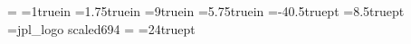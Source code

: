 \magnification=
\hoffset=1truein
\voffset=1.75truein
\hsize=9truein
\vsize=5.75truein
\def\plainoutput{\shipout\vbox{\makelogo\nointerlineskip\makeheadline
  \vskip-5pt\pagebody
  \makefootline
  \makebottom}
 \advancepageno
 \ifnum\outputpenalty>-20000 \else\dosupereject\fi}
 \newskip\headlineskip
 \headlineskip=-40.5truept
 \newskip\headlineheight
 \headlineheight=8.5truept
\font\jplfont=jpl_logo scaled694
\def\makelogo{\vbox to0pt{\vskip-.65truein
 \hbox{\jplfont JPL\hss}\vss}}
\def\makeheadline{\vbox to0pt{\vskip\headlineskip
  \line{\vbox to\headlineheight{}\the\headline}\vss}
 \nointerlineskip}
\footline={\hfil}
\newskip\footlineskip
\footlineskip=24truept
\def\makefootline{\baselineskip=\footlineskip\line{\the\footline}}
\def\outputformatnumber#1{\ifx\pagenumformat\arabic \count255=#1%
\else\count255=-#1\fi{\ifnum\count255<0%
\ifx\pagenumformat\ROMAN\uppercase\expandafter{\romannumeral-\count255}%
\else\romannumeral-\count255\fi\else\number\count255\fi%
}}
\def\makebottom{\bottomsize\bottomstyle\baselineskip=13truept%
\line{\hfill\viewinitials\quad\viewdate}%
\line{\hfill Page \outputformatnumber{\pageno}\ %
of \outputformatnumber{\viewmaxpageno}}}
\def\roman{roman}\def\arabic{arabic}\def\ROMAN{ROMAN}
